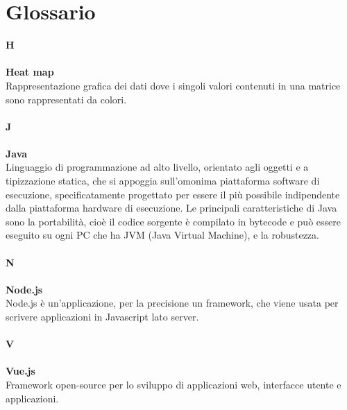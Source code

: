 \chapter{Glossario} \label{Glossario}
\textbf{H} \\
\\
\textbf{Heat map} \\
 Rappresentazione grafica dei dati dove i singoli valori contenuti in una matrice sono rappresentati da colori. \\
\\
\textbf{J} \\
\\
\textbf{Java} \\
Linguaggio di programmazione ad alto livello, orientato agli oggetti e a tipizzazione statica, che si appoggia sull'omonima piattaforma software di esecuzione, specificatamente progettato per essere il più possibile indipendente dalla piattaforma hardware di esecuzione. Le principali caratteristiche di Java sono la portabilità, cioè il codice sorgente
è compilato in bytecode e può essere eseguito su ogni PC che ha JVM (Java Virtual Machine), e la robustezza. \\
\\
\textbf{N}\\
\\
\textbf{Node.js} \\
Node.js è un’applicazione, per la precisione un framework, che viene usata per scrivere applicazioni in Javascript lato server. \\
\\
\textbf{V}\\
\\
\textbf{Vue.js}\\
 Framework open-source per lo sviluppo di applicazioni web, interfacce utente e applicazioni.